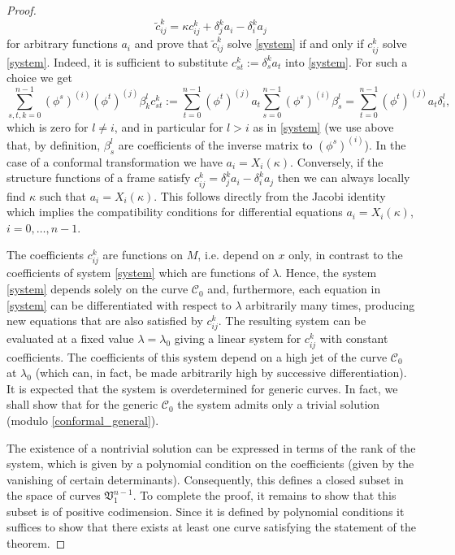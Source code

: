 \documentclass[11pt]{amsart}
\theoremstyle{definition}
\newcommand{\CC}{\mathcal{C}}
\begin{document}
\begin{proof}
\begin{equation}\label{conformal_general}
\tilde c_{ij}^k=\kappa c_{ij}^k+\delta_j^ka_i-\delta_i^ka_j
\end{equation}
for arbitrary functions $a_i$ and prove that $\tilde c_{ij}^k$ solve \eqref{system} if and only if $c_{ij}^k$ solve \eqref{system}.
Indeed, it is sufficient to substitute $c_{st}^k:=\delta_s^ka_t$ into \eqref{system}. For such a choice we get
\[
\sum_{s,t,k=0}^{n-1}(\phi^s)^{(i)}(\phi^t)^{(j)}\beta_k^lc_{st}^k:=\sum_{t=0}^{n-1}(\phi^t)^{(j)}a_t\sum_{s=0}^{n-1}(\phi^s)^{(i)}\beta^l_s=\sum_{t=0}^{n-1}(\phi^t)^{(j)}a_t\delta^l_i,
\]
which is zero for $l\neq i$, and in particular for $l>i$ as in \eqref{system} (we use above that, by definition, $\beta^l_s$ are coefficients of the inverse matrix to $(\phi^s)^{(i)}$). In the case of a conformal transformation we have $a_i=X_i(\kappa)$. Conversely, if the structure functions of a frame satisfy $c_{ij}^k=\delta_j^ka_i-\delta_i^ka_j$ then we can always locally find $\kappa$ such that $a_i=X_i(\kappa)$. This follows directly from the Jacobi identity which implies the compatibility conditions for differential equations $a_i=X_i(\kappa)$, $i=0,\ldots,n-1$.

The coefficients $c_{ij}^k$ are functions on $M$, i.e. depend on $x$ only, in contrast to the coefficients of system \eqref{system} which are functions of $\lambda$. Hence, the system \eqref{system} depends solely on the curve $\CC_0$ and, furthermore, each equation in \eqref{system} can be differentiated with respect to $\lambda$ arbitrarily many times, producing new equations that are also satisfied by $c_{ij}^k$. The resulting system can be evaluated at a fixed value $\lambda=\lambda_0$ giving a linear system for $c_{ij}^k$ with constant coefficients. The coefficients of this system depend on a high jet of the curve $\CC_0$ at $\lambda_0$ (which can, in fact, be made arbitrarily high by successive differentiation). It is expected that the system is overdetermined for generic curves. In fact, we shall show that for the generic $\CC_0$ the system admits only a trivial solution (modulo \eqref{conformal_general}).

The existence of a nontrivial solution can be expressed in terms of the rank of the system, which is given by a polynomial condition on the coefficients (given by the vanishing of certain determinants). Consequently, this defines a closed subset in the space of curves $\mathfrak{V}^{n-1}_1$. To complete the proof, it remains to show that this subset is of positive codimension. Since it is defined by polynomial conditions it suffices to show that there exists at least one curve satisfying the statement of the theorem.


\end{proof}
\end{document}
